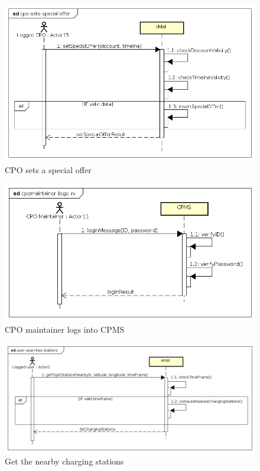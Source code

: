 \begin{figure}[!h]
    \begin{center}
        \includegraphics[keepaspectratio, width=16cm]{Sequence/cpo-sets-special-offer.png}
        \caption{\ac{CPO} sets a special offer}
    \end{center}
\end{figure}
\begin{figure}[!h]
    \begin{center}
        \includegraphics[keepaspectratio, width=16cm]{Sequence/cpomaintainer-logs-in.png}
        \caption{\ac{CPO} maintainer logs into \ac{CPMS}}
    \end{center}
\end{figure}
\begin{figure}[!h]
    \begin{center}
        \includegraphics[keepaspectratio, width=16cm]{Sequence/user-searches-stations.png}
        \caption{Get the nearby charging stations}
    \end{center}
\end{figure}
